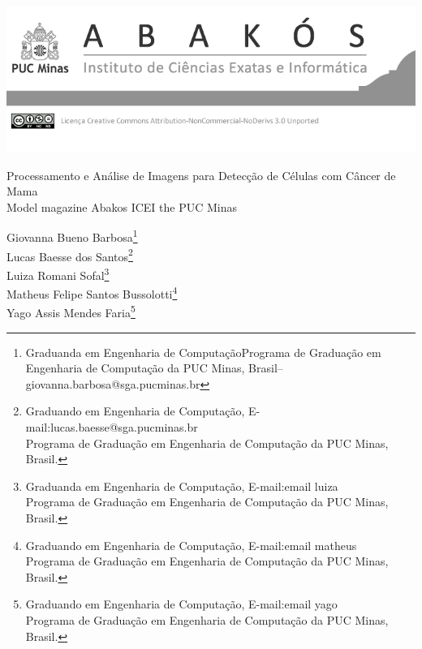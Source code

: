\documentclass[a4paper,12pt,Times]{article}
\makeatletter
\newcommand{\monog}{Processamento e Análise de Imagens para Detecção de Células com Câncer de Mama}
\newcommand{\monogES}{Model magazine Abakos ICEI the PUC Minas}
\newcommand{\origem}{Brasil}
\newcommand{\AutorA}{Giovanna Bueno Barbosa}
\newcommand{\funcaoA}{Graduanda em Engenharia de Computação}
\newcommand{\emailA}{giovanna.barbosa@sga.pucminas.br}
\newcommand{\cursA}{Programa de Graduação em Engenharia de Computação da PUC Minas}
\newcommand{\AutorB}{Lucas Baesse dos Santos}
\newcommand{\funcaoB}{Graduando em Engenharia de Computação}
\newcommand{\emailB}{lucas.baesse@sga.pucminas.br}
\newcommand{\cursB}{Programa de Graduação em Engenharia de Computação da PUC Minas}
\newcommand{\AutorC}{Luiza Romani Sofal}
\newcommand{\funcaoC}{Graduanda em Engenharia de Computação}
\newcommand{\emailC}{email luiza}
\newcommand{\cursC}{Programa de Graduação em Engenharia de Computação da PUC Minas}
\newcommand{\AutorD}{Matheus Felipe Santos Bussolotti}
\newcommand{\funcaoD}{Graduando em Engenharia de Computação}
\newcommand{\emailD}{email matheus}
\newcommand{\cursD}{Programa de Graduação em Engenharia de Computação da PUC Minas}
\newcommand{\AutorE}{Yago Assis Mendes Faria}
\newcommand{\funcaoE}{Graduando em Engenharia de Computação}
\newcommand{\emailE}{email yago}
\newcommand{\cursE}{Programa de Graduação em Engenharia de Computação da PUC Minas}
\makeatother
\begin{document}

\begin{flushleft}

\begin{minipage} [c][5cm][b]{16.5cm} %
\includegraphics[scale=2.8]{figuras/pucmg.png} 
\end{minipage}

 \vspace{0cm} {
 \singlespacing \Large{\monog {} \\ }
  \normalsize{\monogES}
 }
\end{flushleft}
\begin{flushright}
\singlespacing 
\normalsize{\AutorA \footnote{\funcaoA \cursA, \origem -- \emailA }} \\
\normalsize{\AutorB \footnote{\funcaoB, E-mail:\emailB \\ \cursB, \origem. }} \\
\normalsize{\AutorC \footnote{\funcaoC, E-mail:\emailC \\ \cursC, \origem. }} \\
\normalsize{\AutorD \footnote{\funcaoD, E-mail:\emailD \\ \cursD, \origem. }} \\
\normalsize{\AutorE \footnote{\funcaoE, E-mail:\emailE \\ \cursE, \origem. }} \\

\end{flushright}
\thispagestyle{empty}
\end{document}
